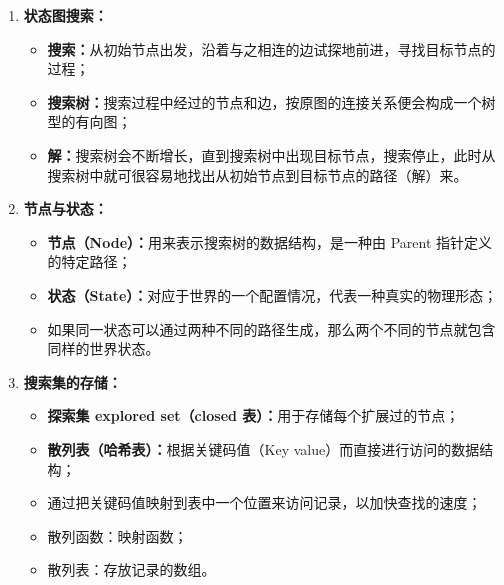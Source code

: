 \documentclass[../main.tex]{subfiles}
\begin{document}
\begin{enumerate}
    \item \textbf{状态图搜索：}
    \begin{itemize}
        \item \textbf{搜索：}从初始节点出发，沿着与之相连的边试探地前进，寻找目标节点的过程；
        \item \textbf{搜索树：}搜索过程中经过的节点和边，按原图的连接关系便会构成一个树型的有向图；
        \item \textbf{解：}搜索树会不断增长，直到搜索树中出现目标节点，搜索停止，此时从搜索树中就可很容易地找出从初始节点到目标节点的路径（解）来。
    \end{itemize}

    \item \textbf{节点与状态：}
    \begin{itemize}
        \item \textbf{节点（Node）：}用来表示搜索树的数据结构，是一种由 Parent 指针定义的特定路径；
        \item \textbf{状态（State）：}对应于世界的一个配置情况，代表一种真实的物理形态；
        \item 如果同一状态可以通过两种不同的路径生成，那么两个不同的节点就包含同样的世界状态。
    \end{itemize}

    \item \textbf{搜索集的存储：}
    \begin{itemize}
        \item \textbf{探索集 explored set（closed 表）：}用于存储每个扩展过的节点；
        \item \textbf{散列表（哈希表）：}根据关键码值（Key value）而直接进行访问的数据结构；
        \item 通过把关键码值映射到表中一个位置来访问记录，以加快查找的速度；
        \item 散列函数：映射函数；
        \item 散列表：存放记录的数组。
    \end{itemize}


\end{enumerate}
\end{document}
